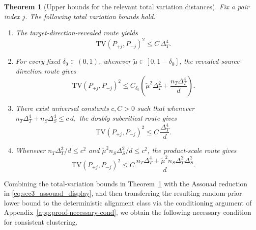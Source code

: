 \documentclass[10pt]{article}
\newtheorem{theorem}{Theorem}
\newcommand{\TV}{\mathrm{TV}}
\newcommand{\trg}{T}
\newcommand{\nT}{n_{\trg}}
\newcommand{\DeltaT}{\Delta_{\trg}}
\newcommand{\src}{S}
\newcommand{\nS}{n_{\src}}
\newcommand{\DeltaS}{\Delta_{\src}}
\begin{document}
\begin{theorem}[Upper bounds for the relevant total variation distances]
\label{thm:sec3_tv_three_routes}
Fix a pair index $j$. The following total variation bounds hold.
\begin{enumerate}
    \item The target-direction-revealed route yields
    \begin{equation}
        \label{eq:sec3_tv_oracle1}
        \TV(P_{+j},P_{-j})^2
        \le
        C\,\DeltaT^4.
    \end{equation}

    \item For every fixed $\delta_0\in(0,1)$, whenever
    $\tilde\mu\in[0,1-\delta_0]$, the revealed-source-direction route gives
    \begin{equation}
        \label{eq:sec3_tv_oracle}
        \TV(P_{+j},P_{-j})^2
        \le
        C_{\delta_0}\left(
            \tilde\mu^2\DeltaT^2
            +
            \frac{\nT\DeltaT^4}{d}
        \right).
    \end{equation}

    \item There exist universal constants $c,C>0$ such that whenever
    $
        \nT\DeltaT^4+\nS\DeltaS^4\le c\,d,
    $
    the doubly subcritical route gives
    \begin{equation}
        \label{eq:sec3_tv_doubly}
        \TV(P_{+j},P_{-j})^2
        \le
        C\,\frac{\DeltaT^4}{d}.
    \end{equation}

    \item Whenever
    $\nT\DeltaT^2/d\le c^2$ and
    $\tilde\mu^2\nS\DeltaS^2/d\le c^2$, the product-scale route gives
    \begin{equation}
        \label{eq:sec3_tv_product}
        \TV(P_{+j},P_{-j})^2
        \le
        C\,\frac{\nT\DeltaT^4+\tilde\mu^2\nS\DeltaT^2\DeltaS^2}{d}.
    \end{equation}
\end{enumerate}
\end{theorem}

Combining the total-variation bounds in Theorem~\ref{thm:sec3_tv_three_routes}
with the Assouad reduction in \eqref{eq:sec3_assouad_display}, and then
transferring the resulting random-prior lower bound to the deterministic
alignment class via the conditioning argument of Appendix~\ref{app:proof-necessary-cond},
we obtain the following necessary condition for consistent clustering.
\end{document}

